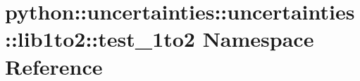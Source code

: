 \hypertarget{namespacepython_1_1uncertainties_1_1uncertainties_1_1lib1to2_1_1test__1to2}{
\section{python::uncertainties::uncertainties::lib1to2::test\_\-1to2 Namespace Reference}
\label{namespacepython_1_1uncertainties_1_1uncertainties_1_1lib1to2_1_1test__1to2}
}
